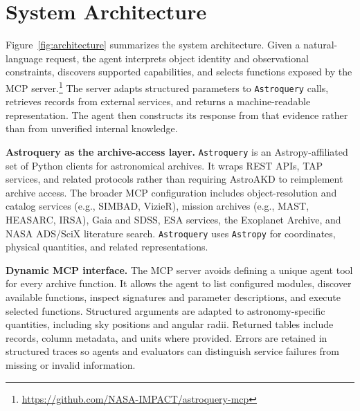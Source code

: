 \documentclass[11pt,twoside]{article}
\begin{document}
\section{System Architecture}

Figure~\ref{fig:architecture} summarizes the system architecture. Given a natural-language request, the agent interprets object identity and observational constraints, discovers supported capabilities, and selects functions exposed by the MCP server.\footnote{\url{https://github.com/NASA-IMPACT/astroquery-mcp}} The server adapts structured parameters to {\tt Astroquery} calls, retrieves records from external services, and returns a machine-readable representation. The agent then constructs its response from that evidence rather than from unverified internal knowledge.




\noindent \textbf{Astroquery as the archive-access layer.} {\tt Astroquery} \citep{Ginsburg2019} is an Astropy-affiliated set of Python clients for astronomical archives. It wraps REST APIs, TAP services, and related protocols rather than requiring AstroAKD to reimplement archive access. The broader MCP configuration includes object-resolution and catalog services (e.g., SIMBAD, VizieR), mission archives (e.g., MAST, HEASARC, IRSA), Gaia and SDSS, ESA services, the Exoplanet Archive, and NASA ADS/SciX literature search. {\tt Astroquery} uses {\tt Astropy} \citep{AstropyCollaboration2022} for coordinates, physical quantities, and related representations.

\smallskip

\noindent \textbf{Dynamic MCP interface.} The MCP server avoids defining a unique agent tool for every archive function. It allows the agent to list configured modules, discover available functions, inspect signatures and parameter descriptions, and execute selected functions. Structured arguments are adapted to astronomy-specific quantities, including sky positions and angular radii. Returned tables include records, column metadata, and units where provided. Errors are retained in structured traces so agents and evaluators can distinguish service failures from missing or invalid information.
\end{document}
